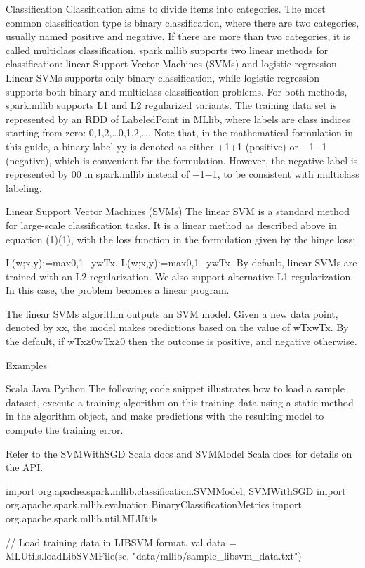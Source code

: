 Classification
Classification aims to divide items into categories. The most common classification type is binary classification, where there are two categories, usually named positive and negative. If there are more than two categories, it is called multiclass classification. spark.mllib supports two linear methods for classification: linear Support Vector Machines (SVMs) and logistic regression. Linear SVMs supports only binary classification, while logistic regression supports both binary and multiclass classification problems. For both methods, spark.mllib supports L1 and L2 regularized variants. The training data set is represented by an RDD of LabeledPoint in MLlib, where labels are class indices starting from zero: 0,1,2,…0,1,2,…. Note that, in the mathematical formulation in this guide, a binary label yy is denoted as either +1+1 (positive) or −1−1 (negative), which is convenient for the formulation. However, the negative label is represented by 00 in spark.mllib instead of −1−1, to be consistent with multiclass labeling.

Linear Support Vector Machines (SVMs)
The linear SVM is a standard method for large-scale classification tasks. It is a linear method as described above in equation (1)(1), with the loss function in the formulation given by the hinge loss:

L(w;x,y):=max{0,1−ywTx}.
L(w;x,y):=max{0,1−ywTx}.
By default, linear SVMs are trained with an L2 regularization. We also support alternative L1 regularization. In this case, the problem becomes a linear program.

The linear SVMs algorithm outputs an SVM model. Given a new data point, denoted by xx, the model makes predictions based on the value of wTxwTx. By the default, if wTx≥0wTx≥0 then the outcome is positive, and negative otherwise.

Examples

Scala
Java
Python
The following code snippet illustrates how to load a sample dataset, execute a training algorithm on this training data using a static method in the algorithm object, and make predictions with the resulting model to compute the training error.

Refer to the SVMWithSGD Scala docs and SVMModel Scala docs for details on the API.

import org.apache.spark.mllib.classification.{SVMModel, SVMWithSGD}
import org.apache.spark.mllib.evaluation.BinaryClassificationMetrics
import org.apache.spark.mllib.util.MLUtils

// Load training data in LIBSVM format.
val data = MLUtils.loadLibSVMFile(sc, "data/mllib/sample_libsvm_data.txt")

